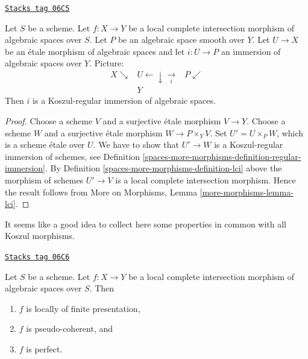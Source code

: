 \begin{lemma}[Lci]
\label{spaces-more-morphisms-lemma-lci}
\href{https://stacks.math.columbia.edu/tag/06C5}{\texttt{Stacks tag 06C5}}

Let $S$ be a scheme.
Let $f : X \to Y$ be a local complete intersection morphism
of algebraic spaces over $S$.
Let $P$ be an algebraic space smooth over $Y$.
Let $U \to X$ be an \'etale morphism of algebraic spaces
and let $i : U \to P$ an immersion of algebraic spaces over $Y$.
Picture:
$$
\begin{array}{ccc}X \searrow & U \longleftarrow\downarrow\underset{i}{\longrightarrow} & P \swarrow \\  & Y & \end{array}
$$
Then $i$ is a Koszul-regular immersion of algebraic spaces.
\end{lemma}

\begin{proof}
Choose a scheme $V$ and a surjective \'etale morphism $V \to Y$.
Choose a scheme $W$ and a surjective \'etale morphism $W \to P \times_Y V$.
Set $U' = U \times_P W$, which is a scheme \'etale over $U$.
We have to show that $U' \to W$ is a Koszul-regular immersion of
schemes, see
Definition \ref{spaces-more-morphisms-definition-regular-immersion}.
By
Definition \ref{spaces-more-morphisms-definition-lci}
above the morphism of schemes $U' \to V$ is a local complete intersection
morphism. Hence the result follows from
More on Morphisms, Lemma \ref{more-morphisms-lemma-lci}.
\end{proof}

It seems like a good idea to collect here some properties in common
with all Koszul morphisms.

\begin{lemma}
\label{spaces-more-morphisms-lemma-lci-properties}
\href{https://stacks.math.columbia.edu/tag/06C6}{\texttt{Stacks tag 06C6}}

Let $S$ be a scheme. Let $f : X \to Y$ be a local complete intersection
morphism of algebraic spaces over $S$. Then
\begin{enumerate}
\item $f$ is locally of finite presentation,
\item $f$ is pseudo-coherent, and
\item $f$ is perfect.
\end{enumerate}
\end{lemma}

